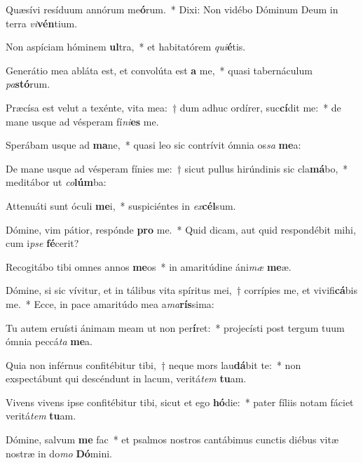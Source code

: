 \item Quæsívi resíduum annórum me\textbf{ó}rum.~* Dixi: Non vidébo Dóminum Deum in terra \textit{vi}\textbf{vén}tium.
\item Non aspíciam hóminem \textbf{ul}tra,~* et habitatórem \textit{qui}\textbf{é}tis.
\item Generátio mea abláta est, et convolúta est \textbf{a} me,~* quasi tabernáculum \textit{pa}\textbf{stó}rum.
\item Præcísa est velut a texénte, vita mea:~† dum adhuc ordírer, suc\textbf{cí}dit me:~* de mane usque ad vésperam fí\textit{ni}\textbf{es} me.
\item Sperábam usque ad \textbf{ma}ne,~* quasi leo sic contrívit ómnia os\textit{sa} \textbf{me}a:
\item De mane usque ad vésperam fínies me:~† sicut pullus hirúndinis sic cla\textbf{má}bo,~* meditábor ut \textit{co}\textbf{lúm}ba:
\item Attenuáti sunt óculi \textbf{me}i,~* suspiciéntes in \textit{ex}\textbf{cél}sum.
\item Dómine, vim pátior, respónde \textbf{pro} me.~* Quid dicam, aut quid respondébit mihi, cum i\textit{pse} \textbf{fé}cerit?
\item Recogitábo tibi omnes annos \textbf{me}os~* in amaritúdine áni\textit{mæ} \textbf{me}æ.
\item Dómine, si sic vívitur, et in tálibus vita spíritus mei,~† corrípies me, et vivifi\textbf{cá}bis me.~* Ecce, in pace amaritúdo mea a\textit{ma}\textbf{rís}sima:
\item Tu autem eruísti ánimam meam ut non per\textbf{í}ret:~* projecísti post tergum tuum ómnia peccá\textit{ta} \textbf{me}a.
\item Quia non inférnus confitébitur tibi,~† neque mors lau\textbf{dá}bit te:~* non exspectábunt qui descéndunt in lacum, veritá\textit{tem} \textbf{tu}am.
\item Vivens vivens ipse confitébitur tibi, sicut et ego \textbf{hó}die:~* pater fíliis notam fáciet veritá\hspace{0.02em}\textit{tem} \textbf{tu}am.
\item Dómine, salvum \textbf{me} fac~* et psalmos nostros cantábimus cun\-ctis diébus vitæ nostræ in do\textit{mo} \textbf{Dó}mini.
